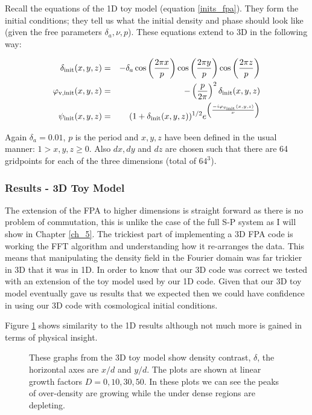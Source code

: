 Recall the equations of the 1D toy model (equation \ref{inits_fpa}). They form the initial conditions; they tell us what the initial density and phase should look like (given the free parameters $\delta_a, \nu, p$). These equations extend to 3D in the following way:

\begin{eqnarray}
\delta_{\rm init}(x,y,z)&=&-\delta_a\cos\left(\frac{2\pi x}{p}\right)\cos\left(\frac{2\pi y}{p}\right)\cos\left(\frac{2\pi z}{p}\right) \\
\varphi_{\rm v,init}(x,y,z) &=& -\left(\frac{p}{2\pi}\right)^2  \delta_{\rm init}(x,y,z) \\
\psi_{\rm init}(x,y,z) &=& (1+\delta_{\rm init}(x,y,z))^{1/2}e^{\left(\frac{-i\varphi_{v_{\rm init}}(x,y,z)}{\nu}\right)}
\end{eqnarray}

Again $\delta_a = 0.01$, $p$ is the period and $x,y,z$ have been defined in the usual manner: 
$ 1> x,y,z \ge 0 $. Also $dx,dy$ and $dz$ are chosen such that there are 64 gridpoints for each of the three dimensions (total of $64^3$).

\subsubsection{Results - 3D Toy Model}
The extension of the FPA to higher dimensions is straight forward as there is no problem of commutation, this is unlike the case of the full S-P system as I will show in Chapter \ref{ch_5}. The trickiest part of implementing a 3D FPA code is working the FFT algorithm and understanding how it re-arranges the data. This means that manipulating the density field in the Fourier domain was far trickier in 3D that it was in 1D. In order to know that our 3D code was correct we tested with an extension of the toy model used by our 1D code. Given that our 3D toy model eventually gave us results that we expected then we could have confidence in using our 3D code with cosmological initial conditions.

Figure \ref{fig.threed} shows similarity to the 1D results although not much more is gained in terms of physical insight.

\begin{figure}[htb]
   \begin{center}
     \leavevmode
                \epsfxsize=80mm
                 \nolinebreak
      		\epsfxsize=80mm
      		\epsfxsize=80mm
                 \nolinebreak
      		\epsfxsize=80mm

   \end{center}
\caption{These graphs from the 3D toy model show density contrast, $\delta$, the horizontal axes are $x/d$ and $y/d$. The plots are shown at linear growth factors $D=0,10,30,50$. In these plots we can see the peaks of over-density are growing while the under dense regions are depleting.}
\label{fig.threed}
\end{figure} 

